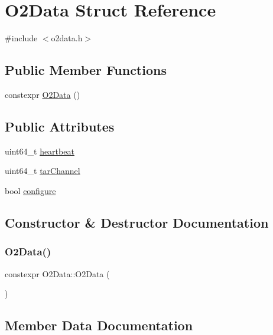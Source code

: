\hypertarget{structO2Data}{}\section{O2\+Data Struct Reference}
\label{structO2Data}


{\ttfamily \#include $<$o2data.\+h$>$}

\subsection*{Public Member Functions}
\begin{DoxyCompactItemize}
\item 
constexpr \hyperlink{structO2Data_ae44193da0113573d4633ae665f5f7469}{O2\+Data} ()
\end{DoxyCompactItemize}
\subsection*{Public Attributes}
\begin{DoxyCompactItemize}
\item 
uint64\+\_\+t \hyperlink{structO2Data_a135569ac2e921d53f529feb03658b591}{heartbeat}
\item 
uint64\+\_\+t \hyperlink{structO2Data_a014a1e616d7f89e4af1358ae6c9a2a9a}{tar\+Channel}
\item 
bool \hyperlink{structO2Data_a6a66820a745578d5ccebaec0c9fea948}{configure}
\end{DoxyCompactItemize}


\subsection{Constructor \& Destructor Documentation}
\mbox{\label{structO2Data_ae44193da0113573d4633ae665f5f7469}} 
\subsubsection{\texorpdfstring{O2\+Data()}{O2Data()}}
{\footnotesize\ttfamily constexpr O2\+Data\+::\+O2\+Data (\begin{DoxyParamCaption}{ }\end{DoxyParamCaption})\hspace{0.3cm}{\ttfamily [inline]}}



\subsection{Member Data Documentation}
\mbox{\label{structO2Data_a6a66820a745578d5ccebaec0c9fea948}} 
